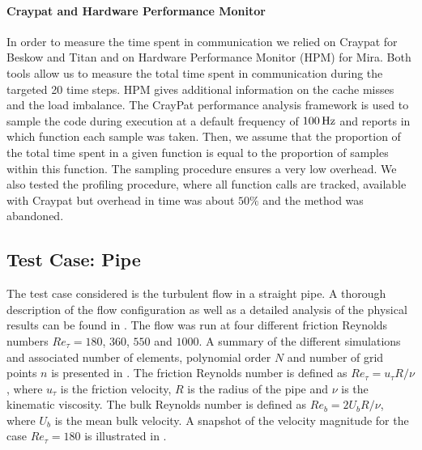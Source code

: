 \documentclass{sig-alternate}
\begin{document}
\paragraph{Craypat and Hardware Performance Monitor}
In order to measure the time spent in communication we relied on Craypat for
Beskow and Titan and on Hardware Performance Monitor (HPM) for Mira. Both tools
allow us to measure the total time spent in communication during the targeted 20 time
steps. HPM gives additional information on the cache misses and the load
imbalance. The CrayPat performance analysis framework is used to sample the code during execution at a default frequency of $\unit[100]{Hz}$ and reports in which function each sample was taken. Then, we assume that the proportion of the total time spent in a given function is equal to the proportion of samples within this function. The sampling procedure ensures a very low overhead. We also tested the profiling procedure, where all function calls are tracked, available with Craypat but overhead in time was about $50\%$ and the method was abandoned.
\subsection{Test Case: Pipe}
\label{sec:pipe}

The test case considered is the turbulent flow in a straight pipe. A thorough description of the flow configuration as well as a detailed analysis of the physical results can be found in \cite{Khoury2013}. The flow was run at four different friction Reynolds numbers $Re_{\tau} = 180$, $360$, $550$ and $1000$. A summary of the different simulations and associated number of elements, polynomial order $N$ and number of grid points $n$ is presented in . The friction Reynolds number is defined as $Re_{\tau} = u_{\tau} R / \nu$, where $u_{\tau}$ is the friction velocity, $R$ is the radius of the pipe and $\nu$ is the kinematic viscosity. The bulk Reynolds number is defined as $Re_{b} = 2 U_b R / \nu$, where $U_b$ is the mean bulk velocity. A snapshot of the velocity magnitude for the case $Re_{\tau} = 180$ is illustrated in .
\end{document}
